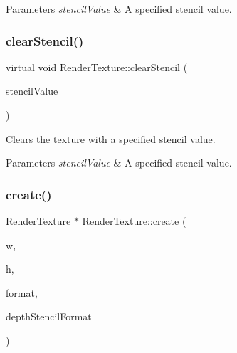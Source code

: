 \begin{DoxyParams}{Parameters}
{\em stencil\+Value} & A specified stencil value. \\
\hline
\end{DoxyParams}
\mbox{\label{classRenderTexture_a8b0c62632ff8f1ae8ab082f1061379d2}} 
\subsubsection{\texorpdfstring{clear\+Stencil()}{clearStencil()}\hspace{0.1cm}{\footnotesize\ttfamily [2/2]}}
{\footnotesize\ttfamily virtual void Render\+Texture\+::clear\+Stencil (\begin{DoxyParamCaption}\item[{int}]{stencil\+Value }\end{DoxyParamCaption})\hspace{0.3cm}{\ttfamily [virtual]}}

Clears the texture with a specified stencil value.


\begin{DoxyParams}{Parameters}
{\em stencil\+Value} & A specified stencil value. \\
\hline
\end{DoxyParams}
\mbox{\label{classRenderTexture_a12dbd5bb59e5f86eb57890b528c899a5}} 
\subsubsection{\texorpdfstring{create()}{create()}\hspace{0.1cm}{\footnotesize\ttfamily [1/6]}}
{\footnotesize\ttfamily \hyperlink{classRenderTexture}{Render\+Texture} $\ast$ Render\+Texture\+::create (\begin{DoxyParamCaption}\item[{int}]{w,  }\item[{int}]{h,  }\item[{\hyperlink{classTexture2D_a45d9d8bb5a0669def36bbdfbfb91d220}{Texture2\+D\+::\+Pixel\+Format}}]{format,  }\item[{G\+Luint}]{depth\+Stencil\+Format }\end{DoxyParamCaption})\hspace{0.3cm}{\ttfamily [static]}}

